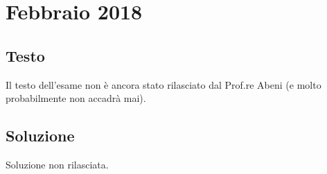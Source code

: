 \section{Febbraio 2018}

\subsection*{Testo}

Il testo dell'esame non è ancora stato rilasciato dal Prof.re Abeni (e molto probabilmente non accadrà mai).

\subsection*{Soluzione}

Soluzione non rilasciata.

